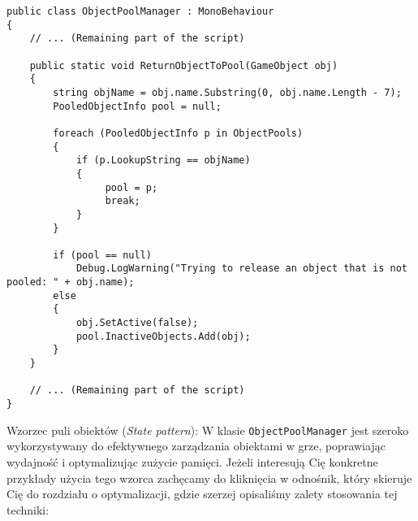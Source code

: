 \begin{codebox}
\begin{lstlisting}[language={[Sharp]C}]
public class ObjectPoolManager : MonoBehaviour
{
    // ... (Remaining part of the script)

    public static void ReturnObjectToPool(GameObject obj)
    {
        string objName = obj.name.Substring(0, obj.name.Length - 7);
        PooledObjectInfo pool = null;

        foreach (PooledObjectInfo p in ObjectPools)
        {
            if (p.LookupString == objName)
            {
                 pool = p;
                 break;
            }
        }

        if (pool == null)
            Debug.LogWarning("Trying to release an object that is not pooled: " + obj.name);
        else
        {
            obj.SetActive(false);
            pool.InactiveObjects.Add(obj);
        }
    }

    // ... (Remaining part of the script)
}
\end{lstlisting}
\end{codebox}
Wzorzec puli obiektów (\textit{State pattern}): W klasie \texttt{ObjectPoolManager} jest szeroko wykorzystywany do efektywnego zarządzania obiektami w grze, poprawiając wydajność i optymalizując zużycie pamięci. Jeżeli interesują Cię konkretne przykłady użycia tego wzorca zachęcamy do kliknięcia w odnośnik, który skieruje Cię do rozdziału o optymalizacji, gdzie szerzej opisaliśmy zalety stosowania tej techniki:  